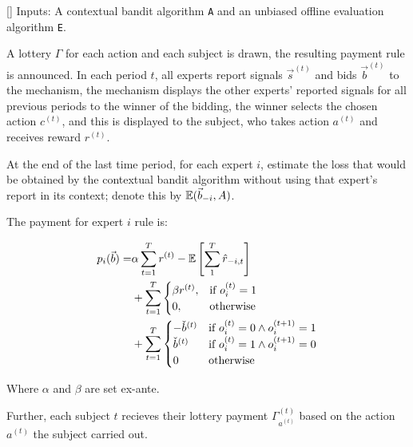 \begin{mech}\label{mech:bidbandit}[]
   Inputs: A contextual bandit algorithm \texttt{A} and an unbiased offline evaluation algorithm \texttt{E}.

A lottery $\Gamma$ for each action and each subject is drawn, the resulting payment rule is announced.
In each period $t$, all experts report signals $\vec s^{(t)}$ and bids $\vec b^{(t)}$ to the mechanism, the mechanism displays the other experts' reported signals for all previous periods to the winner of the bidding, the winner selects the chosen action $c^{(t)}$, and this is displayed to the subject, who takes action $a^{(t)}$ and receives reward $r^{(t)}$.

At the end of the last time period, for each expert $i$, estimate the loss that would be obtained by the contextual bandit algorithm without using that expert's report in its context; denote this by $\operatorname*{\mathbb E}(\vec b_{-i},A)$.

The payment for expert $i$ rule is:

   \begin{align}
      p_i(\vec b) =& 
      \alpha \sum_{t=1}^T r^{(t)} -  \operatorname*{\mathbb E}\left[\sum_1^T \hat{r}_{-i,t}\right]\\
      &+
   \sum_{t=1}^T
\begin{cases}
   \beta r^{(t)} ,& \text{if } o^{(t)}_{i} = 1\\
     0,              & \text{otherwise}
\end{cases}\\
      &+
   \sum_{t=1}^T
\begin{cases}
     - \check b^{(t)} & \text{if } o^{(t)}_{i} = 0 \land o^{(t+1)}_{i} = 1\\
      \check b^{(t)} & \text{if } o^{(t)}_{i}= 1 \land o^{(t+1)}_{i} = 0 \\
		0              & \text{otherwise}
\end{cases}
   \end{align}

Where $\alpha$ and $\beta$ are set ex-ante. 

   Further, each subject $t$ recieves their lottery payment $\Gamma^{(t)}_{a^{(t)}}$ based on the action $a^{(t)}$ the subject carried out.
\end{mech}


